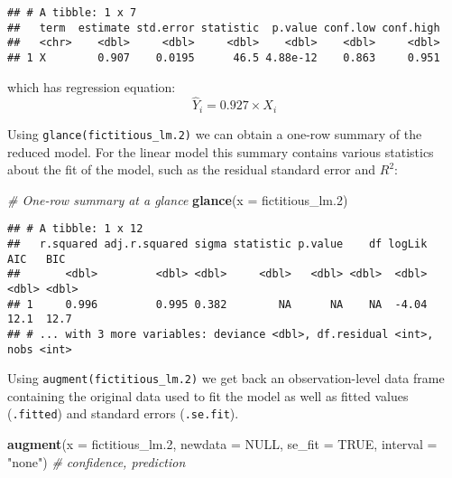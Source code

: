\documentclass[
]{book}
\newenvironment{Shaded}{\begin{snugshade}}{\end{snugshade}}
\newcommand{\CommentTok}[1]{\textcolor[rgb]{0.56,0.35,0.01}{\textit{#1}}}
\newcommand{\DataTypeTok}[1]{\textcolor[rgb]{0.13,0.29,0.53}{#1}}
\newcommand{\FloatTok}[1]{\textcolor[rgb]{0.00,0.00,0.81}{#1}}
\newcommand{\KeywordTok}[1]{\textcolor[rgb]{0.13,0.29,0.53}{\textbf{#1}}}
\newcommand{\NormalTok}[1]{#1}
\newcommand{\OtherTok}[1]{\textcolor[rgb]{0.56,0.35,0.01}{#1}}
\newcommand{\StringTok}[1]{\textcolor[rgb]{0.31,0.60,0.02}{#1}}
\begin{document}
\begin{verbatim}
## # A tibble: 1 x 7
##   term  estimate std.error statistic  p.value conf.low conf.high
##   <chr>    <dbl>     <dbl>     <dbl>    <dbl>    <dbl>     <dbl>
## 1 X        0.907    0.0195      46.5 4.88e-12    0.863     0.951
\end{verbatim}

which has regression equation:
\[
\hat Y_i=0.927\times X_i
\]

Using \texttt{glance(fictitious\_lm.2)} we can obtain a one-row summary of the reduced model. For the linear model this summary contains various statistics about the fit of the model, such as the residual standard error and \(R^2\):

\begin{Shaded}
\begin{Highlighting}[]
\CommentTok{# One-row summary at a glance}
\KeywordTok{glance}\NormalTok{(}\DataTypeTok{x =}\NormalTok{ fictitious_lm}\FloatTok{.2}\NormalTok{)}
\end{Highlighting}
\end{Shaded}

\begin{verbatim}
## # A tibble: 1 x 12
##   r.squared adj.r.squared sigma statistic p.value    df logLik   AIC   BIC
##       <dbl>         <dbl> <dbl>     <dbl>   <dbl> <dbl>  <dbl> <dbl> <dbl>
## 1     0.996         0.995 0.382        NA      NA    NA  -4.04  12.1  12.7
## # ... with 3 more variables: deviance <dbl>, df.residual <int>, nobs <int>
\end{verbatim}

Using \texttt{augment(fictitious\_lm.2)} we get back an observation-level data frame containing the original data used to fit the model as well as fitted values (\texttt{.fitted}) and standard errors (\texttt{.se.fit}).

\begin{Shaded}
\begin{Highlighting}[]
\KeywordTok{augment}\NormalTok{(}\DataTypeTok{x =}\NormalTok{ fictitious_lm}\FloatTok{.2}\NormalTok{,}
        \DataTypeTok{newdata =} \OtherTok{NULL}\NormalTok{,}
        \DataTypeTok{se_fit =} \OtherTok{TRUE}\NormalTok{,}
        \DataTypeTok{interval =} \StringTok{"none"}\NormalTok{) }\CommentTok{# confidence, prediction}
\end{Highlighting}
\end{Shaded}
\end{document}
